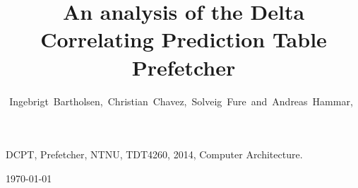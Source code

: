 \documentclass[journal]{IEEEtran}
\begin{document}
\title{An analysis of the Delta Correlating Prediction Table Prefetcher}

\author{Ingebrigt~Bartholsen,~Christian~Chavez,~Solveig~Fure~and~Andreas~Hammar,~}



\maketitle



\begin{IEEEkeywords}
DCPT, Prefetcher, NTNU, TDT4260, 2014, Computer Architecture.
\end{IEEEkeywords}
\IEEEpeerreviewmaketitle

\curMonth
\hfill \today














{}




\end{document}
